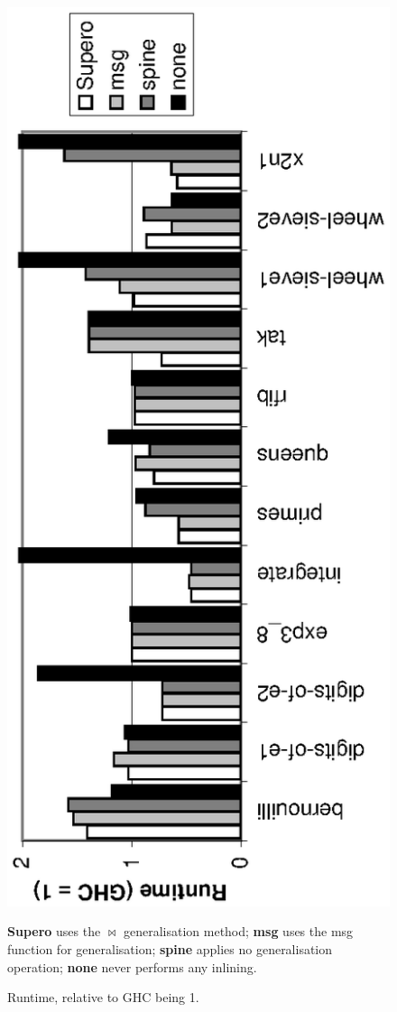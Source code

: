 \begin{figure}
\begin{center}
\includegraphics[scale=0.75,angle=270]{graphics/supero-nofib.eps}
\end{center}

\smallskip
\textbf{Supero} uses the $\bowtie$ generalisation method; \textbf{msg} uses the msg function for generalisation; \textbf{spine} applies no generalisation operation; \textbf{none} never performs any inlining. \\

\caption{Runtime, relative to GHC being 1.}
\label{figS:haskell_results}
\end{figure}

